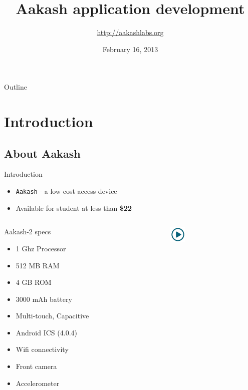 \documentclass{beamer}
\title[Aakash application development]{Aakash application development}
\author{\url{http://aakashlabs.org}}
\institute{Indian Institute of Technology, Bombay}
\date{February 16, 2013}
\begin{document}
 \begin{frame}
   \titlepage
 \end{frame}
 \begin{frame}{Outline}
  \tableofcontents
 \end{frame}
 \section{Introduction}
 \subsection{About Aakash}
 \begin{frame}{Introduction}
 \begin{itemize}
   \item {\tt Aakash} - a low cost access device
   \item Available for student at less than {\bf \$22}
 \end{itemize}
 \begin{columns}
 \begin{column}{.48\textwidth}
 \begin{block}{Aakash-2 specs}
 \begin{itemize}
   \item 1 Ghz Processor
   \item 512 MB RAM
   \item 4 GB ROM
   \item 3000 mAh battery
   \item Multi-touch, Capacitive
   \item Android ICS (4.0.4) 
   \item Wifi connectivity
   \item Front camera
   \item Accelerometer
 \end{itemize}
 \end{block}
 \end{column}%
 \begin{column}{.20\textwidth}
   \centerline{\href{file:///opt/aakashdemo/android_app.3gp}{\includegraphics[height=0.8cm,width=0.8cm]{play.jpg}}}
 \end{column}%
 \end{columns}
 \end{frame}
\end{document}
